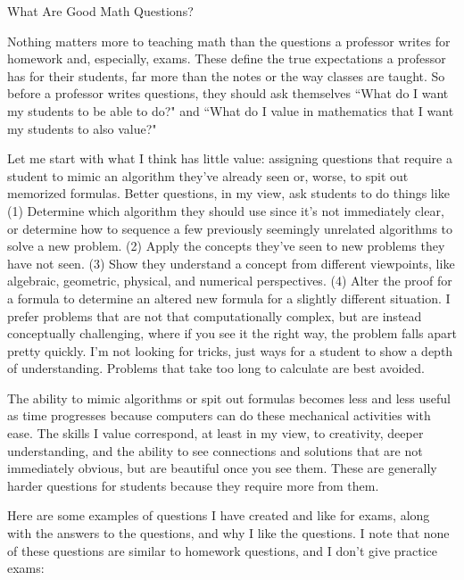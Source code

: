 \documentclass[12pt]{article}
\begin{document}
\begin{center}
{\LARGE What Are Good Math Questions?}
\end{center}

Nothing matters more to teaching math than the questions a professor writes for homework and, especially, exams. These define the true expectations a professor has for their students, far more than the notes or the way classes are taught. So before a professor writes questions, they should ask themselves ``What do I want my students to be able to do?" and ``What do I value in mathematics that I want my students to also value?"

Let me start with what I think has little value: assigning questions that require a student to mimic an algorithm they've already seen or, worse, to spit out memorized formulas. Better questions, in my view, ask students to do things like (1) Determine which algorithm they should use since it's not immediately clear, or determine how to sequence a few previously seemingly unrelated algorithms to solve a new problem. (2) Apply the concepts they've seen to new problems they have not seen. (3) Show they understand a concept from different viewpoints, like algebraic, geometric, physical, and numerical perspectives. (4) Alter the proof for a formula to determine an altered new formula for a slightly different situation.  I prefer problems that are not that computationally complex, but are instead conceptually challenging, where if you see it the right way, the problem falls apart pretty quickly. I'm not looking for tricks, just ways for a student to show a depth of understanding. Problems that take too long to calculate are best avoided.

The ability to mimic algorithms or spit out formulas becomes less and less useful as time progresses because computers can do these mechanical activities with ease. The skills I value correspond, at least in my view, to creativity, deeper understanding, and the ability to see connections and solutions that are not immediately obvious, but are beautiful once you see them. These are generally harder questions for students because they require more from them.

Here are some examples of questions I have created and like for exams, along with the answers to the questions, and why I like the questions. I note that none of these questions are similar to homework questions, and I don't give practice exams:
\end{document}
